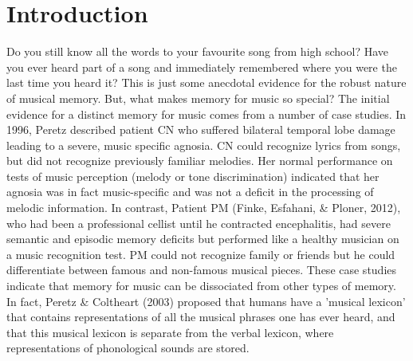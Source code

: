 \documentclass[12pt,letterpaper]{report}
\begin{document}
\section{Introduction}

Do you still know all the words to your favourite song from high school? 
Have you ever heard part of a song and immediately remembered where you were the last time you heard it? 
This is just some anecdotal evidence for the robust nature of musical memory. 
But, what makes memory for music so special? 
The initial evidence for a distinct memory for music comes from a number of case studies. In 1996, Peretz described patient CN who suffered bilateral temporal lobe damage leading to a severe, music specific agnosia. CN could recognize lyrics from songs, but did not recognize previously familiar melodies. Her normal performance on tests of music perception (melody or tone discrimination) indicated that her agnosia was in fact music-specific and was not a deficit in the processing of melodic information. In contrast, Patient PM (Finke, Esfahani, \& Ploner, 2012), who had been a professional cellist until he contracted encephalitis, had severe semantic and episodic memory deficits but performed like a healthy musician on a music recognition test. PM could not recognize family or friends but he could differentiate between famous and non-famous musical pieces. These case studies indicate that memory for music can be dissociated from other types of memory. 
In fact, Peretz \& Coltheart (2003) proposed that humans have a 'musical lexicon' that contains representations of all the musical phrases one has ever heard, and that this musical lexicon is separate from the verbal lexicon, where representations of phonological sounds are stored. 
\end{document}
